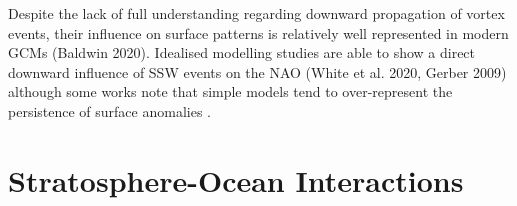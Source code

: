 Despite the lack of full understanding regarding downward propagation of vortex events, their influence on surface patterns is relatively well represented in modern GCMs (Baldwin 2020). Idealised modelling studies are able to show a direct downward influence of SSW events on the NAO (White et al. 2020, Gerber 2009) although some works note that simple models tend to over-represent the persistence of surface anomalies \citep{gerberAnnular2008, gerberTesting2008}. 





\section{Stratosphere-Ocean Interactions}


